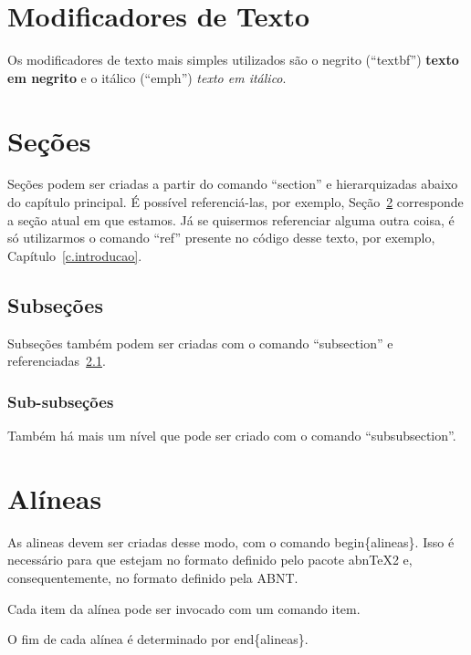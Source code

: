 \section{Modificadores de Texto}
\label{s.modificador}

Os modificadores de texto mais simples utilizados são o negrito (``textbf'') \textbf{texto em negrito} e o itálico (``emph'') \emph{texto em itálico}.

\section{Seções}
\label{s.citacoes}

Seções podem ser criadas a partir do comando ``section'' e hierarquizadas abaixo do capítulo principal. É possível referenciá-las, por exemplo, Seção~\ref{s.citacoes} corresponde a seção atual em que estamos. Já se quisermos referenciar alguma outra coisa, é só utilizarmos o comando ``ref'' presente no código desse texto, por exemplo, Capítulo~\ref{c.introducao}.

\subsection{Subseções}
\label{ss.subsecao}

Subseções também podem ser criadas com o comando ``subsection'' e referenciadas~\ref{ss.subsecao}.

\subsubsection{Sub-subseções}
\label{sss.subsubsecao}

Também há mais um nível que pode ser criado com o comando ``subsubsection''.

\section{Alíneas}
\label{s.alineas}

\begin{alineas}

\item As alineas devem ser criadas desse modo, com o comando begin\{alineas\}. Isso é necessário para que estejam no formato definido pelo pacote abnTeX2 e, consequentemente, no formato definido pela ABNT.

\item Cada item da alínea pode ser invocado com um comando item.

\item O fim de cada alínea é determinado por end\{alineas\}.

\end{alineas}

